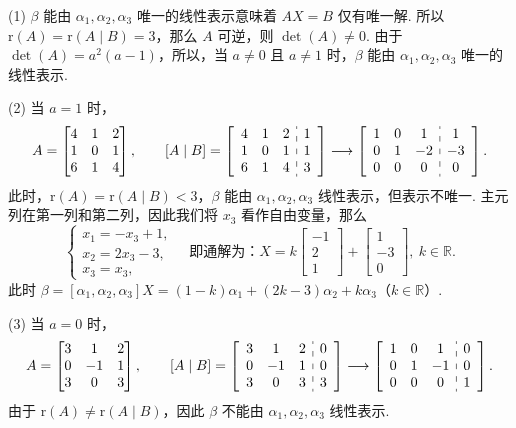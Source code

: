 \documentclass[a4paper,11pt]{ctexart}
\newcommand{\rk}{\mathrm{r}}
\begin{document}
(1) $\beta$ 能由 $\alpha_1, \alpha_2, \alpha_3$ 唯一的线性表示意味着 $AX = B$ 仅有唯一解. 所以 $\rk(A) = \rk(A \mid B) = 3$，那么 $A$ 可逆，则 $\det(A) \neq 0$. 由于 $\det(A) = a^2(a - 1)$，所以，当 $a \neq 0$ 且 $a \neq 1$ 时，$\beta$ 能由 $\alpha_1, \alpha_2, \alpha_3$ 唯一的线性表示.

(2) 当 $a = 1$ 时，
\[
  A = \begin{bmatrix} 4 & 1 & 2 \\ 1 & 0 & 1 \\ 6 & 1 & 4 \end{bmatrix},\qquad
  [A \mid B] = \left[\begin{array}{ccc:c} 4 & 1 & 2 & 1 \\ 1 & 0 & 1 & 1 \\ 6 & 1 & 4 & 3 \end{array}\right]
  \longrightarrow \left[\begin{array}{ccc:c} 1 & 0 & 1 & 1 \\ 0 & 1 & -2 & -3 \\ 0 & 0 & 0 & 0 \end{array}\right].
\]
此时，$\rk(A) = \rk(A \mid B) < 3$，$\beta$ 能由 $\alpha_1, \alpha_2, \alpha_3$ 线性表示，但表示不唯一. 主元列在第一列和第二列，因此我们将 $x_3$ 看作自由变量，那么
\[
  \begin{cases}
    x_1 = -x_3 + 1, \\
    x_2 = 2x_3 - 3, \\
    x_3 = x_3,
  \end{cases}
  \quad\text{即通解为：}
  X = k \begin{bmatrix} -1 \\ 2 \\ 1 \end{bmatrix} + \begin{bmatrix} 1 \\ -3 \\ 0 \end{bmatrix},\ k \in \mathbb{R}.
\]
此时 $\beta = [\alpha_1, \alpha_2, \alpha_3] X = (1 - k)\alpha_1 + (2k - 3)\alpha_2 + k\alpha_3$（$k \in \mathbb{R}$）.

(3) 当 $a = 0$ 时，
\[
  A = \begin{bmatrix} 3 & 1 & 2 \\ 0 & -1 & 1 \\ 3 & 0 & 3 \end{bmatrix},\qquad
  [A \mid B] = \left[\begin{array}{ccc:c} 3 & 1 & 2 & 0 \\ 0 & -1 & 1 & 0 \\ 3 & 0 & 3 & 3 \end{array}\right]
  \longrightarrow \left[\begin{array}{ccc:c} 1 & 0 & 1 & 0 \\ 0 & 1 & -1 & 0 \\ 0 & 0 & 0 & 1 \end{array}\right].
\]
由于 $\rk(A) \neq \rk(A \mid B)$，因此 $\beta$ 不能由 $\alpha_1, \alpha_2, \alpha_3$ 线性表示.
\end{document}
